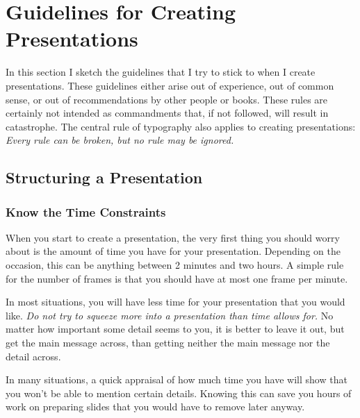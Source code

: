 %

\section{Guidelines for Creating Presentations}


\label{section-guidelines}

In this section I sketch the guidelines that I try to stick to when I
create presentations. These guidelines either arise out of experience,
out of common sense, or out of recommendations by other people or
books. These rules are certainly not intended as commandments that, if
not followed, will result in catastrophe. The central rule of
typography also applies to creating presentations: \emph{Every rule
  can be broken, but no rule may be ignored.} 




\subsection{Structuring a Presentation}

\label{section-structure-guidelines}



\subsubsection{Know the Time Constraints}

When you start to create a presentation, the very first thing you
should worry about is the amount of time you have for your
presentation. Depending on the occasion, this can
be anything between 2 minutes and two hours. A simple rule for the
number of frames is that you should have at most one frame per
minute.

In most situations, you will have less time for your presentation that
you would like. \emph{Do not try to squeeze more into a
  presentation than time allows for.} No matter how important some
detail seems to you, it is better to leave it out, but get the main
message across, than getting neither the main message nor the detail
across. 

In many situations, a quick appraisal of how much time you have will
show that you won't be able to mention certain details. Knowing this can
save you hours of work on preparing slides that you would have to remove
later anyway.



